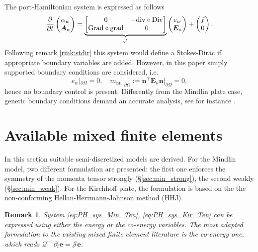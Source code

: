 \documentclass{ifacconf}
\newtheorem{remark}{Remark}
\begin{document}
The port-Hamiltonian system is expressed as follows 
\begin{equation}
\label{eq:PH_sys_Kir_Ten}
\diffp{}{t}
\begin{pmatrix}
\alpha_w \\
\bm{A}_\kappa \\
\end{pmatrix} = 
\underbrace{\begin{bmatrix}
	0  & -\mathrm{div} \circ \mathrm{Div} \\
	\mathrm{Grad} \circ \mathrm{grad}  & 0 \\
	\end{bmatrix}}_{\mathcal{J}}
\begin{pmatrix}
e_w \\
\bm{E}_{\kappa} \\
\end{pmatrix}+ 
\begin{pmatrix}
f \\
0 \\
\end{pmatrix}.
\end{equation}
Following remark \ref{rmk:stdir} this system would define a Stokes-Dirac if appropriate boundary variables are added. However, in this paper simply supported boundary conditions are considered, i.e.
\[
e_w|_{\partial \Omega} = 0, \quad m_{\text{nn}}|_{\partial \Omega}:= \bm{n}^\top \bm{E}_\kappa \bm{n}|_{\partial \Omega} = 0,
\]
hence no boundary control is present. Differently from the Mindlin plate case, generic boundary conditions demand an accurate analysis, see for instance \cite{Blum1990,mixed_kirchhoff}.

\section{Available mixed finite elements}
\label{sec:mixed}

In this section suitable semi-discretized models are derived. For the Mindlin model, two different formulation are presented: the first one enforces the symmetry of the momenta tensor strongly (\S\ref{sec:min_strong}), the second weakly (\S\ref{sec:min_weak}). For the Kirchhoff plate, the formulation is based on the the non-conforming Hellan-Herrmann-Johnson method (HHJ). 

\begin{remark}
System \eqref{eq:PH_sys_Min_Ten}, \eqref{eq:PH_sys_Kir_Ten} can be expressed using either the energy or the co-energy variables. The  most adapted formulation to the existing mixed finite element literature is the co-energy one, which reads $\mathcal{Q}^{-1} \partial_t \bm{e} = \mathcal{J} \bm{e}$.
\end{remark}
\end{document}

